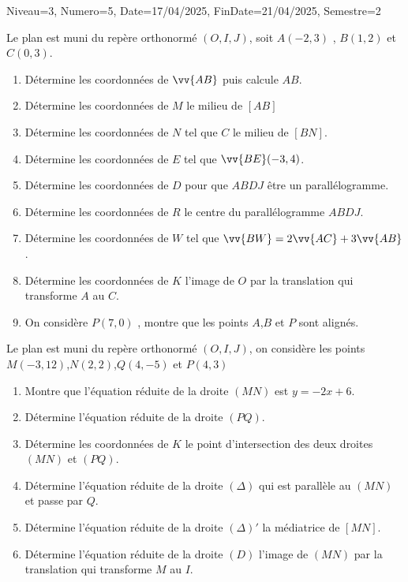 \documentclass[a4paper,12pt]{article}
\begin{document}
\begin{Maquette}[DM]{Niveau=3, Numero=5, Date=17/04/2025, FinDate=21/04/2025, Semestre=2}

\begin{exercice}
Le plan est muni du repère orthonormé  $(O,I,J)$, soit $A(-2,3)$ , $B(1,2)$ et $C(0,3)$.
\begin{enumerate}
\item Détermine les coordonnées de $\vv{AB}$ puis calcule $AB$.
\item Détermine les coordonnées de $M$ le milieu de $[AB]$
\item Détermine les coordonnées de $N$ tel que $C$ le milieu de $[BN]$.
\item Détermine les coordonnées de $E$ tel que $\vv{BE}(-3,4)$.
\item Détermine les coordonnées de $D$ pour que $ABDJ$ être un parallélogramme.
\item Détermine les coordonnées de $R$ le centre du parallélogramme $ABDJ$.
\item Détermine les coordonnées de $W$ tel que $\vv{BW}=2\vv{AC}+3\vv{AB}$.
\item Détermine les coordonnées de $K$ l'image de $O$ par la translation qui transforme $A$ au $C$.
\item On considère $P(7,0)$ , montre que les points $A$,$B$ et $P$ sont alignés.
\end{enumerate}
\end{exercice}

\begin{exercice}
Le plan est muni du repère orthonormé  $(O,I,J)$, on considère les points $M(-3,12)$,$N(2,2)$,$Q(4,-5)$ et $P(4,3)$
\begin{enumerate}
\item Montre que l'équation réduite de la droite $(MN)$ est $y=-2x+6$.
\item Détermine l'équation réduite de la droite $(PQ)$.
\item Détermine les coordonnées de $K$ le point d'intersection des deux droites $(MN)$ et $(PQ)$.
\item Détermine l'équation réduite de la droite $(\Delta)$ qui est parallèle au $(MN)$ et passe par $Q$.
\item Détermine l'équation réduite de la droite $(\Delta)'$ la médiatrice de $[MN]$.
\item Détermine l'équation réduite de la droite $(D)$ l'image de $(MN)$ par la translation qui transforme  $M$ au $I$.
\end{enumerate}
\end{exercice}


\end{Maquette}
\end{document}
